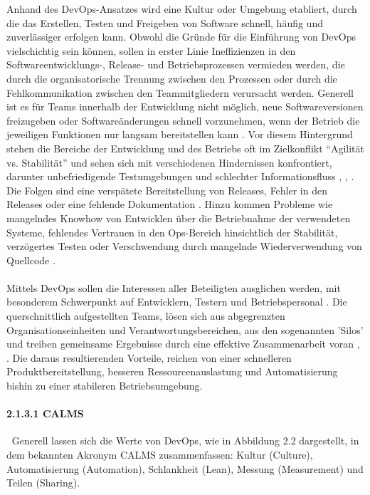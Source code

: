 Anhand des DevOps-Ansatzes wird eine Kultur oder Umgebung etabliert, durch die das Erstellen, Testen und Freigeben von Software schnell, häufig und zuverlässiger erfolgen kann. \cite[S.xxviii]{sharma_devops_2017} Obwohl die Gründe für die Einführung von DevOps vielschichtig sein können, sollen in erster Linie Ineffizienzen in den Softwareentwicklungs-, Release- und Betriebsprozessen vermieden werden, die durch die organisatorische Trennung zwischen den Prozessen \cite{lwakatare_devops_2019} oder durch die Fehlkommunikation zwischen den Teammitgliedern \cite{ebert_devops_2016} verursacht werden. Generell ist es für Teams innerhalb der Entwicklung nicht möglich, neue Softwareversionen freizugeben oder Softwareänderungen schnell vorzunehmen, wenn der Betrieb die jeweiligen Funktionen nur langsam bereitstellen kann \cite[S. 7,8]{sharma_devops_2017}. Vor diesem Hintergrund stehen die Bereiche der Entwicklung und des Betriebs oft im Zielkonflikt "`Agilität vs. Stabilität"' und sehen sich mit verschiedenen Hindernissen konfrontiert, darunter unbefriedigende Testumgebungen und schlechter Informationsfluss \cite{lwakatare_devops_2019}, \cite[S. 8]{sharma_devops_2017}, \cite{konig_devopswelcome_2019}. Die Folgen sind eine verspätete Bereitstellung von Releases, Fehler in den Releases oder eine fehlende Dokumentation \cite[S. 24]{alt_innovationsorientiertes_2017}. Hinzu kommen Probleme wie mangelndes Knowhow von Entwicklen über die Betriebnahme der verwendeten Systeme, fehlendes Vertrauen in den Ops-Bereich hinsichtlich der Stabilität, verzögertes Testen oder Verschwendung durch mangelnde Wiederverwendung von Quellcode \cite{humble_why_2011}.\\\\ Mittels DevOps sollen die Interessen aller Beteiligten ausglichen werden, mit besonderem Schwerpunkt auf Entwicklern, Testern und Betriebspersonal \cite{humble_why_2011}. Die querschnittlich aufgestellten Teams, lösen sich aus abgegrenzten Organisationseinheiten und Verantwortungsbereichen, aus den sogenannten 'Silos' und treiben gemeinsame Ergebnisse durch eine effektive Zusammenarbeit voran \cite[S.5]{halstenberg_devops_2020}, \cite{sollner_devops_2017}. Die daraus resultierenden Vorteile, reichen von einer schnelleren Produktbereitstellung, besseren Ressourcenauslastung und Automatisierung bishin zu einer stabileren Betriebsumgebung. 

\paragraph{2.1.3.1 CALMS} $~$
Generell lassen sich die Werte von DevOps, wie in Abbildung 2.2 dargestellt, in dem bekannten Akronym CALMS zusammenfassen: Kultur (Culture), Automatisierung (Automation), Schlankheit (Lean), Messung (Measurement) und Teilen (Sharing). 

